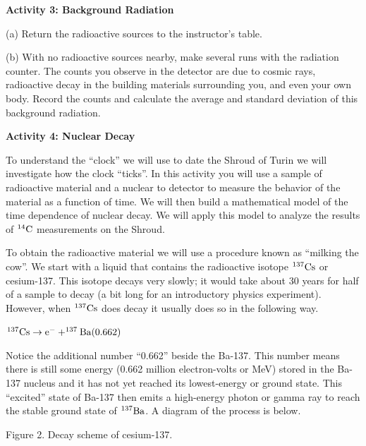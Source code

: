 \textbf{Activity 3: Background Radiation}

(a) Return the radioactive sources to the instructor's table.

(b) With no radioactive sources nearby, make several runs with the radiation counter.
The counts you observe in the detector are due to cosmic rays, radioactive decay
in the building materials surrounding you, and even your own body.
Record the counts and calculate the average and standard deviation of this background
radiation.
\answerspace{15mm}

\pagebreak
\textbf{Activity 4: Nuclear Decay } \nopagebreak

To understand the ``clock'' we will use to date the Shroud of Turin we will investigate
how the clock ``ticks''.
In this activity you will use a sample of radioactive material and a nuclear to 
detector to measure the behavior of the material as a function of time.
We will then build a mathematical model of the time dependence of nuclear decay.
We will apply this model to analyze the results of $\rm ^{14}C$ measurements on
the Shroud.

To obtain the radioactive material we will use a procedure known as
``milking the cow''.
We start with a liquid that contains the radioactive isotope $\rm ^{137}Cs$ or
cesium-137.
This isotope decays very slowly; it would take about 30 years for half of a sample
to decay (a bit long for an introductory physics experiment).
However, when $\rm ^{137}Cs$ does decay it usually does so in the following way.

{\centering \( \rm ^{137}Cs \rightarrow e^- + ^{137}Ba(0.662) \) \par}

Notice the additional number ``0.662'' beside the Ba-137. This number means there
is still some energy (0.662 million electron-volts or MeV)
stored in the Ba-137 nucleus and it has not yet reached
its lowest-energy or ground state.
This ``excited'' state of Ba-137 then emits a high-energy photon or gamma ray to 
reach the stable ground state of $\rm {^{137}Ba}$. A diagram of the
process is below. 

\vspace{0.3cm}
{\centering {} \par}
{\centering Figure 2. Decay scheme of cesium-137. \par}
\vspace{0.3cm}

